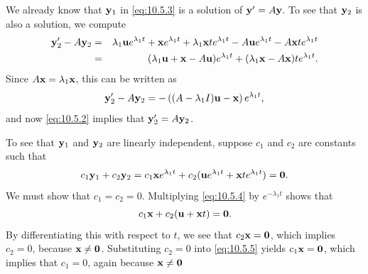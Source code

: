 \documentclass{ximera}
\begin{document}
We already know that ${\bf y}_1$ in \eqref{eq:10.5.3} is a solution of
${\bf y}'=A{\bf y}$. To see that ${\bf y}_2$ is also a solution, we
compute
\begin{eqnarray*}
{\bf y}_2'-A{\bf y}_2&=&\lambda_1{\bf u}e^{\lambda_1t}+{\bf
x} e^{\lambda_1t}
+\lambda_1{\bf x} te^{\lambda_1t}-A{\bf
u}e^{\lambda_1t}-A{\bf x} te^{\lambda_1t}\\
&=&(\lambda_1{\bf u}+{\bf x} -A{\bf
u})e^{\lambda_1t}+(\lambda_1{\bf x} -A{\bf x} )te^{\lambda_1t}.
\end{eqnarray*}
Since $A{\bf x}=\lambda_1{\bf x}$, this can be written as
$$
{\bf y}_2'-A{\bf y}_2=-
\left((A-\lambda_1I){\bf u}-{\bf x}\right)e^{\lambda_1t},
$$
and now \eqref{eq:10.5.2} implies that
${\bf y}_2'=A{\bf y}_2$.

To see that ${\bf y}_1$ and ${\bf y}_2$  are linearly independent,
suppose   $c_1$ and $c_2$ are constants such that
\begin{equation}\label{eq:10.5.4}
c_1{\bf y}_1+c_2{\bf y}_2=c_1{\bf x}e^{\lambda_1t}+c_2({\bf
u}e^{\lambda_1t} +{\bf x}te^{\lambda_1t})={\bf 0}.
\end{equation}
We must show that $c_1=c_2=0$.  Multiplying \eqref{eq:10.5.4}
by $e^{-\lambda_1t}$ shows that
\begin{equation}\label{eq:10.5.5}
c_1{\bf x}+c_2({\bf u} +{\bf x}t)={\bf 0}.
\end{equation}
By differentiating this with respect to $t$, we see that $c_2{\bf
x}={\bf 0}$, which implies $c_2=0$, because ${\bf x}\neq{\bf 0}$.
Substituting  $c_2=0$ into \eqref{eq:10.5.5}  yields $c_1{\bf x}={\bf 0}$,
which implies that $c_1=0$, again because ${\bf x}\neq{\bf 0}$
\end{document}
